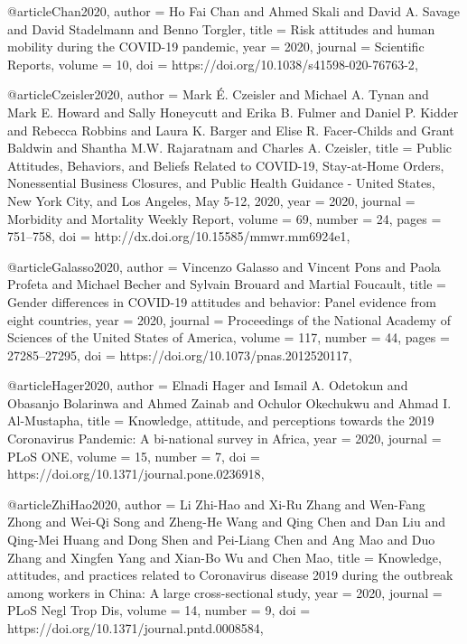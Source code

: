 @article{Chan2020,
  author = {Ho Fai Chan and Ahmed Skali and David A. Savage and David Stadelmann and Benno Torgler},
  title = {Risk attitudes and human mobility during the COVID-19 pandemic},
  year = {2020},
  journal = {Scientific Reports},
  volume = {10},
  doi = {https://doi.org/10.1038/s41598-020-76763-2},
}

@article{Czeisler2020,
  author = {Mark É. Czeisler and Michael A. Tynan and Mark E. Howard and Sally Honeycutt and Erika B. Fulmer and Daniel P. Kidder and Rebecca Robbins and Laura K. Barger and Elise R. Facer-Childs and Grant Baldwin and Shantha M.W. Rajaratnam and Charles A. Czeisler},
  title = {Public Attitudes, Behaviors, and Beliefs Related to COVID-19, Stay-at-Home Orders, Nonessential Business Closures, and Public Health Guidance - United States, New York City, and Los Angeles, May 5-12, 2020},
  year = {2020},
  journal = {Morbidity and Mortality Weekly Report},
  volume = {69},
  number = {24},
  pages = {751--758},
  doi = {http://dx.doi.org/10.15585/mmwr.mm6924e1},
}

@article{Galasso2020,
  author = {Vincenzo Galasso and Vincent Pons and Paola Profeta and Michael Becher and Sylvain Brouard and Martial Foucault},
  title = {Gender differences in COVID-19 attitudes and behavior: Panel evidence from eight countries},
  year = {2020},
  journal = {Proceedings of the National Academy of Sciences of the United States of America},
  volume = {117},
  number = {44},
  pages = {27285--27295},
  doi = {https://doi.org/10.1073/pnas.2012520117},
}

@article{Hager2020,
  author = {Elnadi Hager and Ismail A. Odetokun and Obasanjo Bolarinwa and Ahmed Zainab and Ochulor Okechukwu and Ahmad I. Al-Mustapha},
  title = {Knowledge, attitude, and perceptions towards the 2019 Coronavirus Pandemic: A bi-national survey in Africa},
  year = {2020},
  journal = {PLoS ONE},
  volume = {15},
  number = {7},
  doi = {https://doi.org/10.1371/journal.pone.0236918},
}

@article{ZhiHao2020,
  author = {Li Zhi-Hao and Xi-Ru Zhang and Wen-Fang Zhong and Wei-Qi Song and Zheng-He Wang and Qing Chen and Dan Liu and Qing-Mei Huang and Dong Shen and Pei-Liang Chen and Ang Mao and Duo Zhang and Xingfen Yang and Xian-Bo Wu and Chen Mao},
  title = {Knowledge, attitudes, and practices related to Coronavirus disease 2019 during the outbreak among workers in China: A large cross-sectional study},
  year = {2020},
  journal = {PLoS Negl Trop Dis},
  volume = {14},
  number = {9},
  doi = {https://doi.org/10.1371/journal.pntd.0008584},
}

